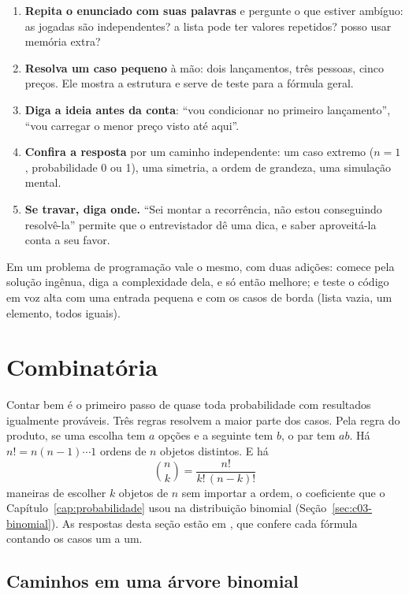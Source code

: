 \begin{enumerate}
  \item \textbf{Repita o enunciado com suas palavras} e pergunte o que estiver ambíguo: as jogadas são independentes? a lista pode ter valores repetidos? posso usar memória extra?
  \item \textbf{Resolva um caso pequeno} à mão: dois lançamentos, três pessoas, cinco preços. Ele mostra a estrutura e serve de teste para a fórmula geral.
  \item \textbf{Diga a ideia antes da conta}: ``vou condicionar no primeiro lançamento'', ``vou carregar o menor preço visto até aqui''.
  \item \textbf{Confira a resposta} por um caminho independente: um caso extremo ($n = 1$, probabilidade 0 ou 1), uma simetria, a ordem de grandeza, uma simulação mental.
  \item \textbf{Se travar, diga onde.} ``Sei montar a recorrência, não estou conseguindo resolvê-la'' permite que o entrevistador dê uma dica, e saber aproveitá-la conta a seu favor.
\end{enumerate}

Em um problema de programação vale o mesmo, com duas adições: comece pela solução ingênua, diga a complexidade dela, e só então melhore; e teste o código em voz alta com uma entrada pequena e com os casos de borda (lista vazia, um elemento, todos iguais).

\section{Combinatória}
\label{sec:c16-combinatoria}

Contar bem é o primeiro passo de quase toda probabilidade com resultados igualmente prováveis. Três regras resolvem a maior parte dos casos. Pela regra do produto, se uma escolha tem $a$ opções e a seguinte tem $b$, o par tem $a b$. Há $n! = n(n-1)\cdots 1$ ordens de $n$ objetos distintos. E há
\begin{equation*}
  \binom{n}{k} = \frac{n!}{k!\,(n-k)!}
\end{equation*}
maneiras de escolher $k$ objetos de $n$ sem importar a ordem, o coeficiente que o Capítulo~\ref{cap:probabilidade} usou na distribuição binomial (Seção~\ref{sec:c03-binomial}). As respostas desta seção estão em , que confere cada fórmula contando os casos um a um.

\subsection{Caminhos em uma árvore binomial}

